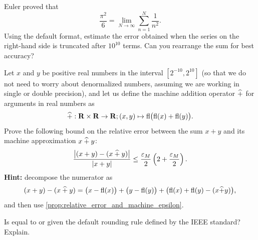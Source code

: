 \begin{compexercise}
    Euler proved that
    \[
        \frac{\pi^2}{6} = \lim_{N \to \infty} \sum_{n=1}^{N} \frac{1}{n^2}.
    \]
    Using the default  format,
    estimate the error obtained when the series on the right-hand side is truncated after $10^{10}$ terms.
    Can you rearrange the sum for best accuracy?
\end{compexercise}

\begin{exercise}
    Let $x$ and $y$ be positive real numbers in the interval $[2^{-10}, 2^{10}]$
    (so that we do not need to worry about denormalized numbers,
    assuming we are working in single or double precision),
    and let us define the machine addition operator $\mathbin{\widehat +}$ for arguments in real numbers as
    \[
        \mathbin{\widehat +}: \mathbf R \times \mathbf R \to \mathbf R; (x, y) \mapsto {\rm fl} \bigl({\rm fl}(x) + {\rm fl}(y)\bigr).
    \]
    Prove the following bound on the relative error between the sum $x+y$ and its machine approximation $x \mathbin{\widehat +} y$:
    \[
        \frac{\bigl| (x + y) - (x \mathbin{\widehat +}  y ) \bigr|}{|x + y|}
        \leq \frac{\varepsilon_M}{2}  \left(2 + \frac{\varepsilon_M}{2}\right).
    \]
    \textbf{Hint:} decompose the numerator as
    \[
        (x + y) - (x \mathbin{\widehat +}  y ) = \bigl(x - {\rm fl}(x)\bigr) + \bigl(y - {\rm fl}(y)\bigr) + \bigl( {\rm fl}(x) + {\rm fl}(y) - (x \widehat + y)\bigr),
    \]
    and then use \cref{prop:relative_error_and_machine_epsilon}.
\end{exercise}

\begin{exercise}
    \label{exercise:floating_point_illustration}
    Is  equal to  or 
    given the default rounding rule defined by the IEEE standard? Explain.
\end{exercise}

